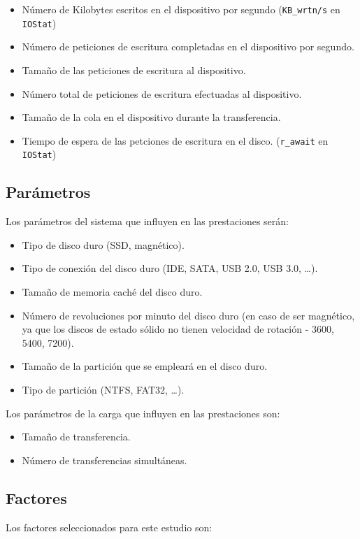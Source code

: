 \documentclass[a4paper,10pt]{article}
\begin{document}
\begin{itemize}
 \item Número de Kilobytes escritos en el dispositivo por segundo (\texttt{KB\_wrtn/s} en \texttt{IOStat})
 \item Número de peticiones de escritura completadas en el dispositivo por segundo.
 \item Tamaño de las peticiones de escritura al dispositivo.
 \item Número total de peticiones de escritura efectuadas al dispositivo.
 \item Tamaño de la cola en el dispositivo durante la transferencia.
 \item Tiempo de espera de las petciones de escritura en el disco. (\texttt{r\_await} en \texttt{IOStat})
\end{itemize}

\subsection{Parámetros}
Los parámetros del sistema que influyen en las prestaciones serán:
\begin{itemize}
 \item Tipo de disco duro (SSD, magnético).
 \item Tipo de conexión del disco duro (IDE, SATA, USB 2.0, USB 3.0, \ldots).
 \item Tamaño de memoria caché del disco duro.
 \item Número de revoluciones por minuto del disco duro (en caso de ser magnético, ya que los discos de estado sólido no tienen
 velocidad de rotación - 3600, 5400, 7200).
 \item Tamaño de la partición que se empleará en el disco duro.
 \item Tipo de partición (NTFS, FAT32, \ldots).
 
 \cite{hddparam}
\end{itemize}

Los parámetros de la carga que influyen en las prestaciones son:
\begin{itemize}
 \item Tamaño de transferencia.
 \item Número de transferencias simultáneas.
\end{itemize}

\subsection{Factores}
Los factores seleccionados para este estudio son:
\end{document}

